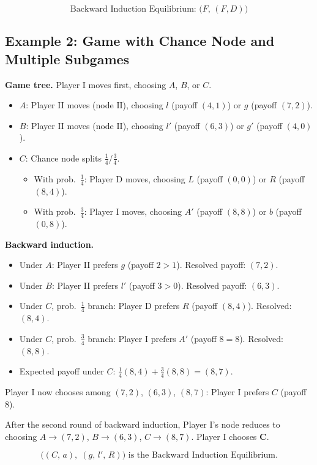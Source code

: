 \documentclass[12pt, a4paper]{article}
\begin{document}
\[
  \boxed{\text{Backward Induction Equilibrium: } \bigl(F,\,(F,D)\bigr)}
\]

\subsection{Example 2: Game with Chance Node and Multiple Subgames}

\noindent\textbf{Game tree.} Player I moves first, choosing $A$, $B$, or $C$.
\begin{itemize}
  \item $A$: Player II moves (node $\mathrm{II}$), choosing $l$ (payoff $(4,1)$) or $g$ (payoff $(7,2)$).
  \item $B$: Player II moves (node $\mathrm{II}$), choosing $l'$ (payoff $(6,3)$) or $g'$ (payoff $(4,0)$).
  \item $C$: Chance node splits $\tfrac{1}{4}$/$\tfrac{3}{4}$.
    \begin{itemize}
      \item With prob.\ $\tfrac{1}{4}$: Player D moves, choosing $L$ (payoff $(0,0)$) or $R$ (payoff $(8,4)$).
      \item With prob.\ $\tfrac{3}{4}$: Player I moves, choosing $A'$ (payoff $(8,8)$) or $b$ (payoff $(0,8)$).
    \end{itemize}
\end{itemize}

\noindent\textbf{Backward induction.}
\begin{itemize}
  \item Under $A$: Player II prefers $g$ (payoff $2 > 1$). Resolved payoff: $(7,2)$.
  \item Under $B$: Player II prefers $l'$ (payoff $3 > 0$). Resolved payoff: $(6,3)$.
  \item Under $C$, prob.\ $\tfrac{1}{4}$ branch: Player D prefers $R$ (payoff $(8,4)$). Resolved: $(8,4)$.
  \item Under $C$, prob.\ $\tfrac{3}{4}$ branch: Player I prefers $A'$ (payoff $8 = 8$). Resolved: $(8,8)$.
  \item Expected payoff under $C$: $\tfrac{1}{4}(8,4) + \tfrac{3}{4}(8,8) = (8,7)$.
\end{itemize}

\noindent Player I now chooses among $(7,2)$, $(6,3)$, $(8,7)$: Player I prefers $C$ (payoff $8$).

\noindent After the second round of backward induction, Player I's node reduces to choosing $A\to(7,2)$, $B\to(6,3)$, $C\to(8,7)$. Player I chooses $\mathbf{C}$.

\[
  \boxed{\bigl((C,\,a),\;(g,\,l',\,R)\bigr) \text{ is the Backward Induction Equilibrium.}}
\]
\end{document}

